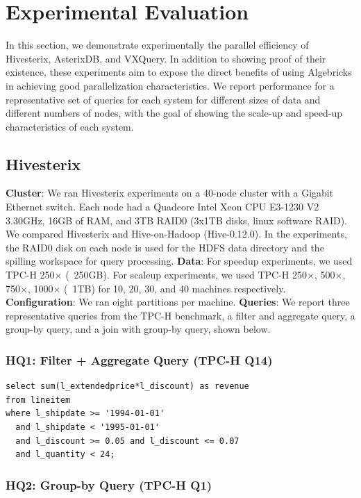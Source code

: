 \section{Experimental Evaluation}\label{sec:experiments}

In this section, we demonstrate experimentally the parallel efficiency of Hivesterix, AsterixDB, and VXQuery. In addition to showing proof of their existence, these experiments aim to expose the direct benefits of using Algebricks in achieving good parallelization characteristics. We report performance for a representative set of queries for each system for different sizes of data and different numbers of nodes, with the goal of showing the scale-up and speed-up characteristics of each system.

\subsection{Hivesterix}
\noindent\textbf{Cluster}: We ran Hivesterix experiments on a 40-node cluster with a Gigabit Ethernet switch. 
Each node had a Quadcore Intel Xeon CPU E3-1230 V2 3.30GHz, 16GB of RAM, and 3TB RAID0 (3x1TB disks, linux software RAID). We compared Hivesterix and Hive-on-Hadoop (Hive-0.12.0). In the experiments,
the RAID0 disk on each node is used for the HDFS data directory
and the spilling workspace for query processing.
\noindent\textbf{Data}: For speedup experiments, we used TPC-H 250$\times$ (~250GB). For scaleup experiments, we used TPC-H 250$\times$,
500$\times$, 750$\times$, 1000$\times$ (~1TB) for 10, 20,
30, and 40 machines respectively.
\noindent\textbf{Configuration}: We ran eight partitions per machine.
\noindent\textbf{Queries}: We report three representative queries
from the TPC-H benchmark, a filter and aggregate query, a group-by query, and 
a join with group-by query, shown below.

\subsubsection*{HQ1: Filter + Aggregate Query (TPC-H Q14)}

\begin{lstlisting}
select sum(l_extendedprice*l_discount) as revenue
from lineitem
where l_shipdate >= '1994-01-01'
  and l_shipdate < '1995-01-01'
  and l_discount >= 0.05 and l_discount <= 0.07
  and l_quantity < 24;
\end{lstlisting}

\subsubsection*{HQ2: Group-by Query (TPC-H Q1)}

